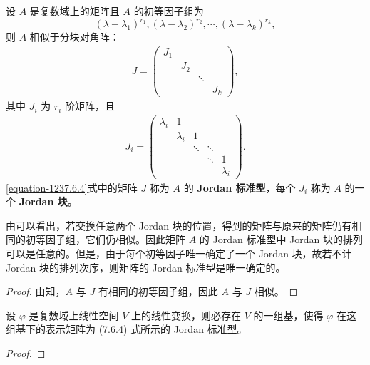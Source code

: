 \documentclass[../../main.tex]{subfiles}
\begin{document}
\begin{theorem}[Jordan标准型]\label{theorem:Jordan标准型}
设 $A$ 是复数域上的矩阵且 $A$ 的初等因子组为
\[
(\lambda - \lambda_1)^{r_1}, (\lambda - \lambda_2)^{r_2}, \cdots, (\lambda - \lambda_k)^{r_k},
\]
则 $A$ 相似于分块对角阵：
\begin{align}
J = \begin{pmatrix}
J_1 & & & \\
& J_2 & & \\
& & \ddots & \\
& & & J_k
\end{pmatrix},
\label{equation-1237.6.4}
\end{align}
其中 $J_i$ 为 $r_i$ 阶矩阵，且
\begin{align*}
J_i = \begin{pmatrix}
\lambda_i & 1 & & & \\
& \lambda_i & 1 & & \\
& & \ddots & \ddots & \\
& & & \ddots & 1 \\
& & & & \lambda_i
\end{pmatrix}.
\end{align*}
\eqref{equation-1237.6.4}式中的矩阵 $J$ 称为 $A$ 的\textbf{ Jordan 标准型}，每个 $J_i$ 称为 $A$ 的一个 \textbf{ Jordan 块}。 
\end{theorem}
\begin{remark}
由可以看出，若交换任意两个 Jordan 块的位置，得到的矩阵与原来的矩阵仍有相同的初等因子组，它们仍相似。因此矩阵 $A$ 的 Jordan 标准型中 Jordan 块的排列可以是任意的。但是，由于每个初等因子唯一确定了一个 Jordan 块，故若不计 Jordan 块的排列次序，则矩阵的 Jordan 标准型是唯一确定的。 
\end{remark}
\begin{proof}
由知，$A$ 与 $J$ 有相同的初等因子组，因此 $A$ 与 $J$ 相似。
\end{proof}

\begin{theorem}
设 $\varphi$ 是复数域上线性空间 $V$ 上的线性变换，则必存在 $V$ 的一组基，使得 $\varphi$ 在这组基下的表示矩阵为 (7.6.4) 式所示的 Jordan 标准型。
\end{theorem}
\begin{proof}

\end{proof}
\end{document}
